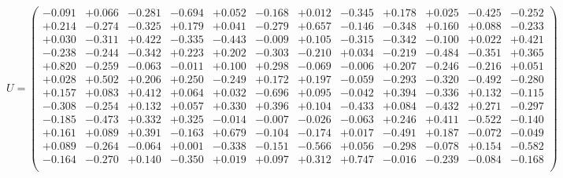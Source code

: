 \documentclass[9pt]{article}
\theoremstyle{plain}
\theoremstyle{definition}
\theoremstyle{remark}
\numberwithin{equation}{section}
\begin{document}
$U = \left(
\begin{array}{
cccccccccccc}
-0.091 & +0.066 & -0.281 & -0.694 & +0.052 & -0.168 & +0.012 & -0.345 & +0.178 & +0.025 & -0.425 & -0.252 \\
+0.214 & -0.274 & -0.325 & +0.179 & +0.041 & -0.279 & +0.657 & -0.146 & -0.348 & +0.160 & +0.088 & -0.233 \\
+0.030 & -0.311 & +0.422 & -0.335 & -0.443 & -0.009 & +0.105 & -0.315 & -0.342 & -0.100 & +0.022 & +0.421 \\
-0.238 & -0.244 & -0.342 & +0.223 & +0.202 & -0.303 & -0.210 & +0.034 & -0.219 & -0.484 & -0.351 & +0.365 \\
+0.820 & -0.259 & -0.063 & -0.011 & +0.100 & +0.298 & -0.069 & -0.006 & +0.207 & -0.246 & -0.216 & +0.051 \\
+0.028 & +0.502 & +0.206 & +0.250 & -0.249 & +0.172 & +0.197 & -0.059 & -0.293 & -0.320 & -0.492 & -0.280 \\
+0.157 & +0.083 & +0.412 & +0.064 & +0.032 & -0.696 & +0.095 & -0.042 & +0.394 & -0.336 & +0.132 & -0.115 \\
-0.308 & -0.254 & +0.132 & +0.057 & +0.330 & +0.396 & +0.104 & -0.433 & +0.084 & -0.432 & +0.271 & -0.297 \\
-0.185 & -0.473 & +0.332 & +0.325 & -0.014 & -0.007 & -0.026 & -0.063 & +0.246 & +0.411 & -0.522 & -0.140 \\
+0.161 & +0.089 & +0.391 & -0.163 & +0.679 & -0.104 & -0.174 & +0.017 & -0.491 & +0.187 & -0.072 & -0.049 \\
+0.089 & -0.264 & -0.064 & +0.001 & -0.338 & -0.151 & -0.566 & +0.056 & -0.298 & -0.078 & +0.154 & -0.582 \\
-0.164 & -0.270 & +0.140 & -0.350 & +0.019 & +0.097 & +0.312 & +0.747 & -0.016 & -0.239 & -0.084 & -0.168 \\
\end{array}
\right)$ \newline 
\end{document}
